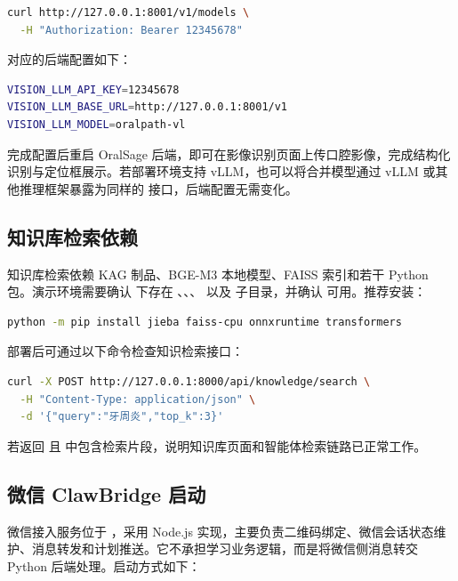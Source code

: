 \begin{lstlisting}[language=bash]
curl http://127.0.0.1:8001/v1/models \
  -H "Authorization: Bearer 12345678"
\end{lstlisting}

对应的后端配置如下：

\begin{lstlisting}[language=bash]
VISION_LLM_API_KEY=12345678
VISION_LLM_BASE_URL=http://127.0.0.1:8001/v1
VISION_LLM_MODEL=oralpath-vl
\end{lstlisting}

完成配置后重启 OralSage 后端，即可在影像识别页面上传口腔影像，完成结构化识别与定位框展示。若部署环境支持 vLLM，也可以将合并模型通过 vLLM 或其他推理框架暴露为同样的  接口，后端配置无需变化。

\subsection{知识库检索依赖}

知识库检索依赖 KAG 制品、BGE-M3 本地模型、FAISS 索引和若干 Python 包。演示环境需要确认  下存在 、、、 以及  子目录，并确认  可用。推荐安装：

\begin{lstlisting}[language=bash]
python -m pip install jieba faiss-cpu onnxruntime transformers
\end{lstlisting}

部署后可通过以下命令检查知识检索接口：

\begin{lstlisting}[language=bash]
curl -X POST http://127.0.0.1:8000/api/knowledge/search \
  -H "Content-Type: application/json" \
  -d '{"query":"牙周炎","top_k":3}'
\end{lstlisting}

若返回  且  中包含检索片段，说明知识库页面和智能体检索链路已正常工作。

\subsection{微信 ClawBridge 启动}

微信接入服务位于 ，采用 Node.js 实现，主要负责二维码绑定、微信会话状态维护、消息转发和计划推送。它不承担学习业务逻辑，而是将微信侧消息转交 Python 后端处理。启动方式如下：

